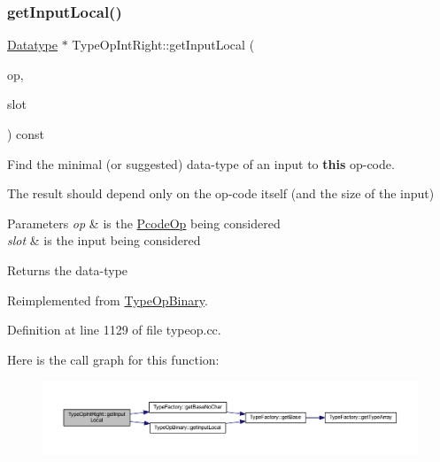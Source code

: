 \subsubsection{\texorpdfstring{getInputLocal()}{getInputLocal()}}
{\footnotesize\ttfamily \mbox{\hyperlink{class_datatype}{Datatype}} $\ast$ Type\+Op\+Int\+Right\+::get\+Input\+Local (\begin{DoxyParamCaption}\item[{const \mbox{\hyperlink{class_pcode_op}{Pcode\+Op}} $\ast$}]{op,  }\item[{int4}]{slot }\end{DoxyParamCaption}) const\hspace{0.3cm}{\ttfamily [virtual]}}



Find the minimal (or suggested) data-\/type of an input to {\bfseries{this}} op-\/code. 

The result should depend only on the op-\/code itself (and the size of the input) 
\begin{DoxyParams}{Parameters}
{\em op} & is the \mbox{\hyperlink{class_pcode_op}{Pcode\+Op}} being considered \\
\hline
{\em slot} & is the input being considered \\
\hline
\end{DoxyParams}
\begin{DoxyReturn}{Returns}
the data-\/type 
\end{DoxyReturn}


Reimplemented from \mbox{\hyperlink{class_type_op_binary_a6b8460b8ee0e97579321c6d02fe4fd29}{Type\+Op\+Binary}}.



Definition at line 1129 of file typeop.\+cc.

Here is the call graph for this function\+:
\nopagebreak
\begin{figure}[H]
\begin{center}
\leavevmode
\includegraphics[width=350pt]{class_type_op_int_right_afd6976a40304a509b940a874da58b31b_cgraph}
\end{center}
\end{figure}
\mbox{\label{class_type_op_int_right_a3c470ddca0dbdab3b01d8734308edd26}} 
